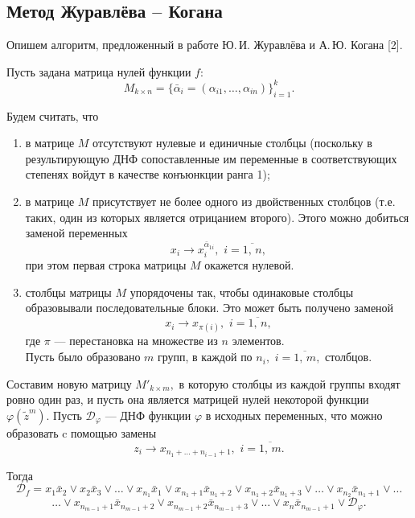 \documentclass[12pt,a4paper,oneside,fleqn,leqno]{article}
\theoremstyle{definition}
\begin{document}
		\subsection{Метод Журавлёва -- Когана} \label{zhuravlev_kogan}
			Опишем алгоритм, предложенный в работе Ю.\,И. Журавлёва и А.\,Ю. Когана [2].\par
			Пусть задана матрица нулей функции $f:$
			$$
				M_{k \times n} = \{\bar{\alpha}_i = (\alpha_{i1},\ldots,\alpha_{in}) \}_{i = 1}^k.
			$$\par
			Будем считать, что
			\begin{enumerate}
				\item
				в матрице $M$ отсутствуют нулевые и единичные столбцы (поскольку в результирующую ДНФ сопоставленные им переменные в соответствующих степенях войдут в качестве конъюнкции ранга 1);
				\item
				в матрице $M$ присутствует не более одного из двойственных столбцов (т.е. таких, один из которых является отрицанием второго). Этого можно добиться заменой переменных
				$$
					x_i \rightarrow x_i^{\bar{\alpha}_{1i}},\,\,i = \overline{1,\,n},
				$$
				при этом первая строка матрицы $M$ окажется нулевой.
				\item
				столбцы матрицы $M$ упорядочены так, чтобы одинаковые столбцы образовывали последовательные блоки. Это может быть получено заменой
					$$
					x_i \rightarrow x_{\pi(i)},\,\,i = \overline{1,\,n},
				$$
				где $\pi$ --- перестановка на множестве из $n$ элементов.\\
				Пусть было образовано $m$ групп, в каждой по $n_i,\,\,i = \overline{1,\,m},$ столбцов.
			\end{enumerate}\par
			Составим новую матрицу $M'_{k \times m},$ в которую столбцы из каждой группы входят ровно один раз, и пусть она является матрицей нулей некоторой функции $\varphi(\tilde z^m).$ Пусть $\mathcal{D}_{\varphi}$ --- ДНФ функции $\varphi$ в исходных переменных, что можно образовать c помощью замены
			$$
				z_i \rightarrow x_{n_1 + \ldots + n_{i - 1} + 1},\,\,i = \overline{1,\,m}.
			$$\par
			Тогда
			$$
				\mathcal{D}_f = x_1\bar{x}_2 \vee x_2\bar{x}_3 \vee \ldots \vee x_{n_1}\bar{x}_1 \vee x_{n_1 + 1}\bar{x}_{n_1 + 2} \vee x_{n_1 + 2}\bar{x}_{n_1 + 3} \vee \ldots \vee x_{n_2}\bar{x}_{n_1 + 1} \vee \ldots
			$$
			$$
				\ldots \vee x_{n_{m - 1} + 1}\bar{x}_{n_{m - 1} + 2} \vee x_{n_{m - 1} + 2}\bar{x}_{n_{m - 1} + 3} \vee \ldots \vee x_{n}\bar{x}_{n_{m - 1} + 1} \vee \mathcal{D}_{\varphi}.
			$$\par
\end{document}
